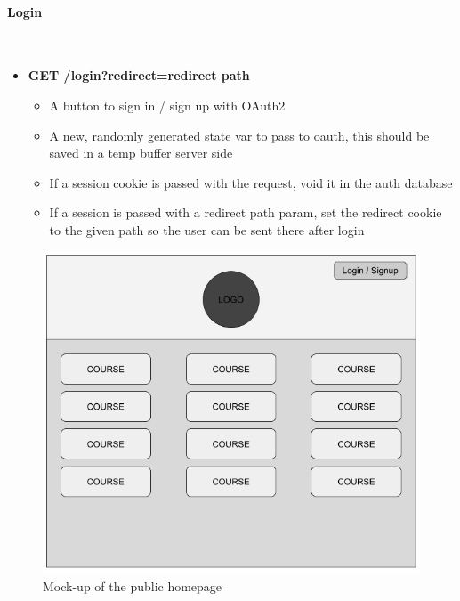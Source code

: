 \documentclass{article}
\begin{document}
\paragraph{Login}\\ 
\begin{itemize}
    \item \textbf{GET /login?redirect=\<redirect path\>}
    \begin{itemize}
        \item A button to sign in / sign up with OAuth2 
        \item A new, randomly generated state var to pass to oauth, this should be saved in a temp buffer server side
        \item If a session cookie is passed with the request, void it in the auth database
        \item If a session is passed with a redirect path param, set the redirect cookie to the given path so the user can be sent there after login
    \end{itemize}
\end{itemize}
\begin{figure}[h]
    \caption{Mock-up of the public homepage}
    \includegraphics[width=\textwidth]{public_homepage}
\end{figure}

\newpage
\end{document}
